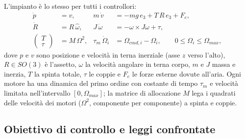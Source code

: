 \documentclass[11pt,a4paper]{article}
\begin{document}
L'impianto è lo stesso per tutti i controllori:
\begin{equation}
\begin{aligned}
\dot p &= v, & m\,\dot v &= -mg\,e_3 + T\,R\,e_3 + F_e,\\
\dot R &= R\,\hat\omega, & J\,\dot\omega &= -\omega \times J\omega + \tau,\\
\begin{pmatrix} T \\ \tau \end{pmatrix} &= M\,\Omega^2, & \tau_m\,\dot\Omega_i &= \Omega_{cmd,i} - \Omega_i, \qquad 0 \le \Omega_i \le \Omega_{max},
\end{aligned}
\end{equation}
dove $p$ e $v$ sono posizione e velocità in terna inerziale (asse $z$ verso l'alto), $R \in SO(3)$ è l'assetto, $\omega$ la velocità angolare in terna corpo, $m$ e $J$ massa e inerzia, $T$ la spinta totale, $\tau$ le coppie e $F_e$ le forze esterne dovute all'aria. Ogni motore ha una dinamica del primo ordine con costante di tempo $\tau_m$ e velocità limitata nell'intervallo $[0, \Omega_{max}]$; la matrice di allocazione $M$ lega i quadrati delle velocità dei motori ($\Omega^2$, componente per componente) a spinta e coppie.

\subsection{Obiettivo di controllo e leggi confrontate}
\end{document}
